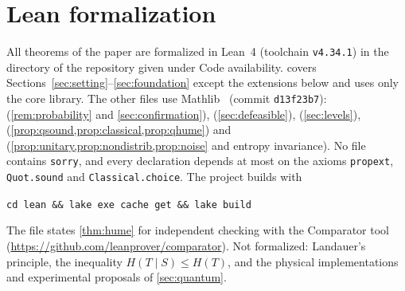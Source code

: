 \section{Lean formalization}\label{app:formalization}

All theorems of the paper are formalized in Lean~4 (toolchain \texttt{v4.34.1}) in the
directory  of the repository given under Code availability.
 covers Sections~\ref{sec:setting}--\ref{sec:foundation} except the extensions
below and uses only the core library. The other files use Mathlib~\cite{mathlib} (commit
\texttt{d13f23b7}):  (\cref{rem:probability} and
\cref{sec:confirmation}),  (\cref{sec:defeasible}), 
(\cref{sec:levels}), 
(\cref{prop:qsound,prop:classical,prop:qhume}) and 
(\cref{prop:unitary,prop:nondistrib,prop:noise} and entropy invariance). No file contains
\texttt{sorry}, and every declaration depends at most on the axioms \texttt{propext},
\texttt{Quot.sound} and \texttt{Classical.choice}. The project builds with
\begin{center}\texttt{cd lean \&\& lake exe cache get \&\& lake build}\end{center}
The file  states
\cref{thm:hume} for independent checking with the Comparator tool
(\url{https://github.com/leanprover/comparator}). Not formalized: Landauer's
principle, the inequality $H(T\mid S)\le H(T)$, and the physical implementations and experimental
proposals of \cref{sec:quantum}.

